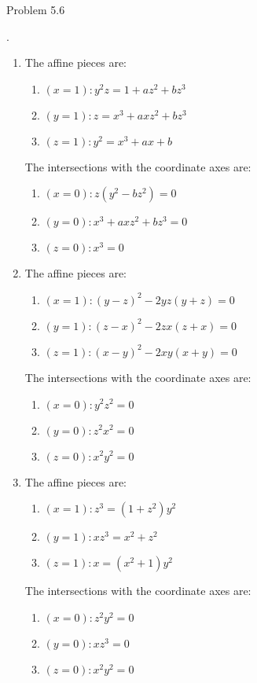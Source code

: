 \documentclass[12pt]{article}
\begin{document}
\begin{prob}
    Problem 5.6
\end{prob}
\sol. \begin{enumerate}[label = (\alph*)]
    \item The affine pieces are:
          \begin{enumerate}[label = (\roman*)]
              \item \( (x=1): y^2z = 1+az^2+bz^3 \)
              \item \( (y=1): z = x^3+axz^2+bz^3 \)
              \item \( (z=1): y^2=x^3+ax+b \)
          \end{enumerate}

          The intersections with the coordinate axes are:
          \begin{enumerate}[label = (\roman*)]
              \item \( (x=0): z(y^2-bz^2)=0 \)
              \item \( (y=0): x^3+axz^2+bz^3 = 0 \)
              \item \( (z=0): x^3=0 \)
          \end{enumerate}
          \smallskip

    \item The affine pieces are:
          \begin{enumerate}[label = (\roman*)]
              \item \( (x=1): (y-z)^2-2yz(y+z)=0 \)
              \item \( (y=1): (z-x)^2-2zx(z+x)=0 \)
              \item \( (z=1): (x-y)^2-2xy(x+y)=0 \)
          \end{enumerate}
          The intersections with the coordinate axes are:
          \begin{enumerate}[label = (\roman*)]
              \item \( (x=0): y^2z^2=0 \)
              \item \( (y=0): z^2x^2=0 \)
              \item \( (z=0): x^2y^2 = 0 \)
          \end{enumerate}
          \smallskip

    \item The affine pieces are:
          \begin{enumerate}[label = (\roman*)]
              \item \( (x=1): z^3=(1+z^2)y^2 \)
              \item \( (y=1): xz^3=x^2+z^2 \)
              \item \( (z=1): x=(x^2+1)y^2 \)
          \end{enumerate}
          The intersections with the coordinate axes are:
          \begin{enumerate}[label = (\roman*)]
              \item \( (x=0): z^2y^2=0 \)
              \item \( (y=0): xz^3=0 \)
              \item \( (z=0): x^2y^2=0 \)
          \end{enumerate}
\end{enumerate}
\end{document}
